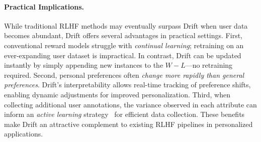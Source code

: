 \paragraph{Practical Implications.}
While traditional RLHF methods may eventually surpass Drift when user data becomes abundant, Drift offers several advantages in practical settings. 
First, conventional reward models struggle with \textit{continual learning}; retraining on an ever-expanding user dataset is impractical. In contrast, Drift can be updated instantly by simply appending new instances to the $W-L$—no retraining required. 
Second, personal preferences often \textit{change more rapidly than general preferences}. Drift’s interpretability allows real-time tracking of preference shifts, enabling dynamic adjustments for improved personalization. 
Third, when collecting additional user annotations, the variance observed in each attribute can inform an \textit{active learning} strategy~\citep{miller2020active} for efficient data collection. These benefits make Drift an attractive complement to existing RLHF pipelines in personalized applications.
